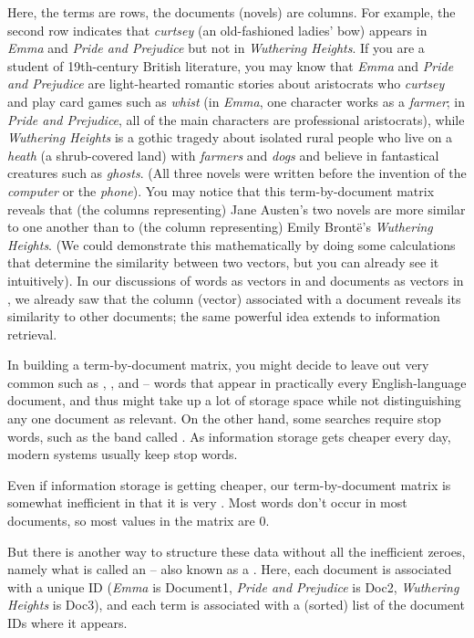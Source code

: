Here, the terms are rows, the documents (novels) are columns.  For example, the second row indicates that \emph{curtsey} (an old-fashioned ladies' bow) appears in \textit{Emma} and \textit{Pride and Prejudice} but not in \textit{Wuthering Heights}.  If you are a student of 19th-century British literature, you may know that \textit{Emma} and \textit{Pride and Prejudice} are light-hearted romantic stories about aristocrats who \emph{curtsey} and play card games such as \emph{whist} (in \textit{Emma}, one character works as a \emph{farmer}; in \textit{Pride and Prejudice}, all of the main characters are professional aristocrats), while \textit{Wuthering Heights} is a gothic tragedy about isolated rural people who live on a \emph{heath} (a shrub-covered land) with \emph{farmers} and \emph{dogs} and believe in fantastical creatures such as \emph{ghosts}.  (All three novels were written before the invention of the \emph{computer} or the \emph{phone}).  You may notice that this term-by-document matrix reveals  that (the columns representing) Jane Austen's two novels are more similar to one another than to (the column representing) Emily Bront\"e's  \textit{Wuthering Heights}.  (We could demonstrate this mathematically by doing some calculations that determine the similarity between two vectors, but you can already see it intuitively).   In our discussions of words as vectors in  and documents as vectors in , we already saw that the column (vector) associated with a document reveals its similarity to other documents; the same powerful idea extends to information retrieval.

In building a term-by-document matrix, you might decide to leave out very common   such as , , and  -- words that appear in practically every English-language document, and thus might  take up a lot of storage space while not distinguishing any one document as relevant.  On the other hand, some searches require stop words, such as the band called .  As information storage gets cheaper every day, modern systems usually keep stop words.

Even if information storage is getting cheaper, our term-by-document matrix is somewhat inefficient in that it is very .  Most words don't occur in most documents, so most values in the matrix are 0.  

But there is another way to structure these data without all the inefficient zeroes, namely what is called an  -- also known as a .  Here, each document is associated with a unique ID (\textit{Emma} is Document1, \textit{Pride and Prejudice} is Doc2, \textit{Wuthering Heights} is Doc3), and each term is associated with a (sorted) list of the document IDs where it appears. 


